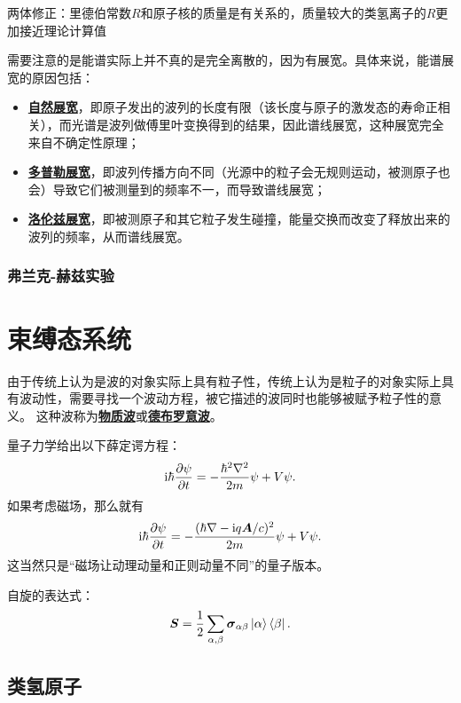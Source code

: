 \documentclass[UTF8, a4paper]{ctexart}
\newcommand*{\ii}{\mathrm{i}}
\newcommand{\concept}[1]{\underline{\textbf{#1}}}
\begin{document}
两体修正：里德伯常数$R$和原子核的质量是有关系的，质量较大的类氢离子的$R$更加接近理论计算值

需要注意的是能谱实际上并不真的是完全离散的，因为有展宽。具体来说，能谱展宽的原因包括：
\begin{itemize}
    \item \concept{自然展宽}，即原子发出的波列的长度有限（该长度与原子的激发态的寿命正相关），而光谱是波列做傅里叶变换得到的结果，因此谱线展宽，这种展宽完全来自不确定性原理；
    \item \concept{多普勒展宽}，即波列传播方向不同（光源中的粒子会无规则运动，被测原子也会）导致它们被测量到的频率不一，而导致谱线展宽；
    \item \concept{洛伦兹展宽}，即被测原子和其它粒子发生碰撞，能量交换而改变了释放出来的波列的频率，从而谱线展宽。
\end{itemize}

\subsubsection{弗兰克-赫兹实验}

\section{束缚态系统}

由于传统上认为是波的对象实际上具有粒子性，传统上认为是粒子的对象实际上具有波动性，需要寻找一个波动方程，被它描述的波同时也能够被赋予粒子性的意义。
这种波称为\concept{物质波}或\concept{德布罗意波}。

量子力学给出以下薛定谔方程：
\begin{equation}
    \ii \hbar \pdv{\psi}{t} = - \frac{\hbar^2 \laplacian}{2m} \psi + V \psi.
\end{equation}
如果考虑磁场，那么就有
\begin{equation}
    \ii \hbar \pdv{\psi}{t} = - \frac{(\hbar \nabla - \ii q \vb*{A}/c)^2}{2m} \psi + V \psi.
\end{equation}
这当然只是“磁场让动理动量和正则动量不同”的量子版本。

自旋的表达式：
\begin{equation}
    \vb*{S} = \frac{1}{2} \sum_{\alpha, \beta} \vb*{\sigma}_{\alpha \beta} \ket{\alpha} \bra{\beta}.
\end{equation}

\subsection{类氢原子}
\end{document}
